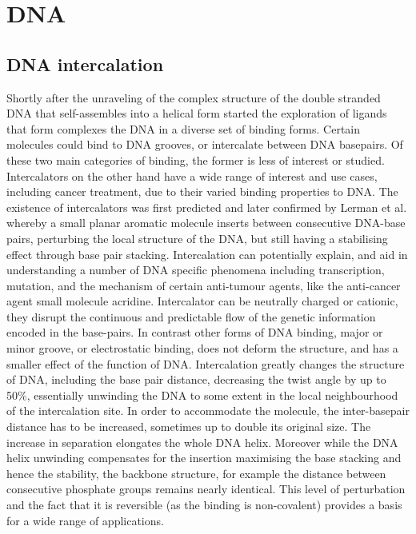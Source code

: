 \section{DNA}

\subsection{DNA intercalation}

Shortly after the unraveling of the complex structure of the double stranded DNA that self-assembles into a helical form started the exploration of ligands that form complexes the DNA in a diverse set of binding forms. Certain molecules could bind to DNA grooves, or intercalate between DNA basepairs. Of these two main categories of binding, the former is less of interest or studied. Intercalators on the other hand have a wide range of interest and use cases, including cancer treatment, due to their varied binding properties to DNA. The existence of intercalators was first predicted and later confirmed by Lerman et al. whereby a small planar aromatic molecule inserts between consecutive DNA-base pairs, perturbing the local structure of the DNA, but still having a stabilising effect through base pair stacking. Intercalation can potentially explain, and aid in understanding a number of DNA specific phenomena including transcription, mutation, and the mechanism of certain anti-tumour agents, like the anti-cancer agent small molecule acridine. Intercalator can be neutrally charged or cationic, they disrupt the continuous and predictable flow of the genetic information encoded in the base-pairs. In contrast other forms of DNA binding, major or minor groove, or electrostatic binding, does not deform the structure, and has a smaller effect of the function of DNA. Intercalation greatly changes the structure of DNA, including the base pair distance, decreasing the twist angle by up to 50\%, essentially unwinding the DNA to some extent in the local neighbourhood of the intercalation site. In order to accommodate the molecule, the inter-basepair distance has to be increased, sometimes up to double its original size. The increase in separation elongates the whole DNA helix. Moreover while the DNA helix unwinding compensates for the insertion maximising the base stacking and hence the stability, the backbone structure, for example the distance between consecutive phosphate groups remains nearly identical. This level of perturbation and the fact that it is reversible (as the binding is non-covalent) provides a basis for a wide range of applications. 

